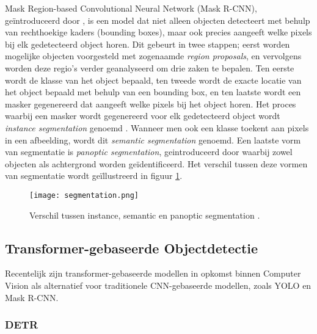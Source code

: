 Mask Region-based Convolutional Neural Network (Mask R-CNN), geïntroduceerd door \textcite{He2018}, is een model dat niet alleen objecten detecteert met behulp van rechthoekige kaders (bounding boxes), 
maar ook precies aangeeft welke pixels bij elk gedetecteerd object horen. Dit gebeurt in twee stappen; eerst worden mogelijke objecten voorgesteld met zogenaamde \textit{region proposals}, en vervolgens
worden deze regio's verder geanalyseerd om drie zaken te bepalen. Ten eerste wordt de klasse van het object bepaald, ten tweede wordt de exacte locatie van het object bepaald met behulp van een bounding box, en ten laatste
wordt een masker gegenereerd dat aangeeft welke pixels bij het object horen. Het proces waarbij een masker wordt gegenereerd voor elk gedetecteerd object wordt \textit{instance segmentation} genoemd \autocite{Hafiz2020}.
Wanneer men ook een klasse toekent aan pixels in een afbeelding, wordt dit \textit{semantic segmentation} genoemd. Een laatste vorm van segmentatie is \textit{panoptic segmentation}, geintroduceerd door \textcite{Kirillov2019} waarbij zowel objecten als achtergrond worden geïdentificeerd.
Het verschil tussen deze vormen van segmentatie wordt geïllustreerd in figuur \ref{fig:segmentation}.

\begin{figure}[H]
  \centering
  \texttt{[image: segmentation.png]}
  \caption[]{\label{fig:segmentation}Verschil tussen instance, semantic en panoptic segmentation \autocite{Kirillov2019}.}
\end{figure}

\subsection{Transformer-gebaseerde Objectdetectie}

Recentelijk zijn transformer-gebaseerde modellen in opkomst binnen Computer Vision als alternatief voor traditionele CNN-gebaseerde modellen, zoals YOLO en Mask R-CNN. 

\subsubsection{DETR}

